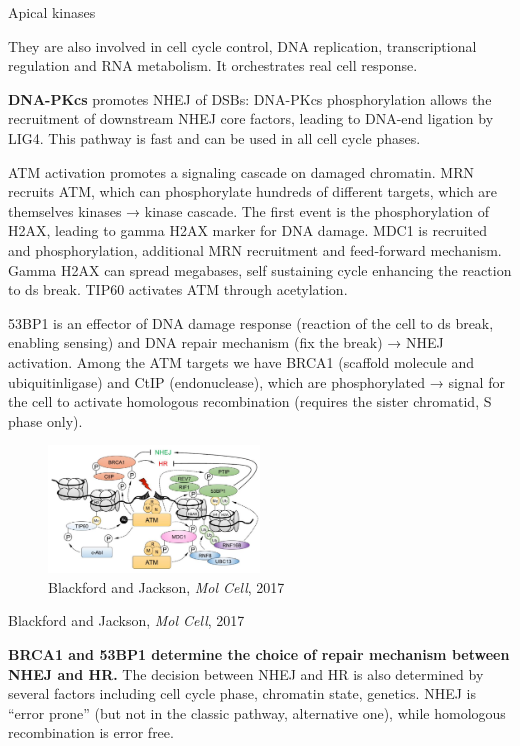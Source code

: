 Apical kinases

They are also involved in cell cycle control, DNA replication, transcriptional regulation and RNA metabolism. It orchestrates real cell response.

\textbf{DNA-PKcs} promotes NHEJ of DSBs: DNA-PKcs phosphorylation allows the recruitment of downstream NHEJ core factors, leading to DNA-end ligation by LIG4. This pathway is fast and can be used in all cell cycle phases.

ATM activation promotes a signaling cascade on damaged chromatin. MRN recruits ATM, which can phosphorylate hundreds of different targets, which are themselves kinases → kinase cascade. The first event is the phosphorylation of H2AX, leading to gamma H2AX marker for DNA damage. MDC1 is recruited and phosphorylation, additional MRN recruitment and feed-forward mechanism. Gamma H2AX can spread megabases, self sustaining cycle enhancing the reaction to ds break. TIP60 activates ATM through acetylation.

53BP1 is an effector of DNA damage response (reaction of the cell to ds break, enabling sensing) and DNA repair mechanism (fix the break) → NHEJ activation. Among the ATM targets we have BRCA1 (scaffold molecule and ubiquitinligase) and CtIP (endonuclease), which are phosphorylated → signal for the cell to activate homologous recombination (requires the sister chromatid, S phase only).

\begin{figure}
\centering
\includegraphics[width=0.5\textwidth]{../_resources/Screen_Shot_2022-11-30_at_09-16-55.png}
\caption{Blackford and Jackson, \emph{Mol Cell}, 2017}
\end{figure}

Blackford and Jackson, \emph{Mol Cell}, 2017

\textbf{BRCA1 and 53BP1 determine the choice of repair mechanism between NHEJ
and HR.} The decision between NHEJ and HR is also determined by several factors including cell cycle phase, chromatin state, genetics. NHEJ is ``error prone'' (but not in the classic pathway, alternative one), while homologous recombination is error free.

